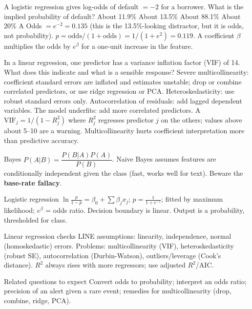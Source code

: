 {A logistic regression gives log-odds of default $=-2$ for a borrower. What is the implied probability of default?}
{About 11.9\%}
{About 13.5\%}
{About 88.1\%}
{About 20\%}
{A}
{Odds $=e^{-2}=0.135$ (this is the 13.5\%-looking distractor, but it is odds, not probability). $p=\text{odds}/(1+\text{odds})=1/(1+e^{2})=0.119$. A coefficient $\beta$ multiplies the odds by $e^{\beta}$ for a one-unit increase in the feature.}

{In a linear regression, one predictor has a variance inflation factor (VIF) of 14. What does this indicate and what is a sensible response?}
{Severe multicollinearity: coefficient standard errors are inflated and estimates unstable; drop or combine correlated predictors, or use ridge regression or PCA.}
{Heteroskedasticity: use robust standard errors only.}
{Autocorrelation of residuals: add lagged dependent variables.}
{The model underfits: add more correlated predictors.}
{A}
{$\text{VIF}_j=1/(1-R_j^2)$ where $R_j^2$ regresses predictor $j$ on the others; values above about 5--10 are a warning. Multicollinearity hurts coefficient interpretation more than predictive accuracy.}

{\begin{block}{Bayes}
		$P(A|B)=\dfrac{P(B|A)P(A)}{P(B)}$. Naive Bayes assumes features are conditionally independent given the class (fast, works well for text). Beware the \textbf{base-rate fallacy}.
	\end{block}
	\begin{block}{Logistic regression}
		$\ln\frac{p}{1-p}=\beta_0+\sum\beta_jx_j$; $p=\frac{1}{1+e^{-z}}$; fitted by maximum likelihood; $e^{\beta}$ = odds ratio. Decision boundary is linear. Output is a probability, thresholded for class.
\end{block}}
{\begin{block}{Linear regression checks}
		LINE assumptions: linearity, independence, normal (homoskedastic) errors. Problems: multicollinearity (VIF), heteroskedasticity (robust SE), autocorrelation (Durbin-Watson), outliers/leverage (Cook's distance). $R^2$ always rises with more regressors; use adjusted $R^2$/AIC.
	\end{block}
	\begin{alertblock}{Related questions to expect}
		Convert odds to probability; interpret an odds ratio; precision of an alert given a rare event; remedies for multicollinearity (drop, combine, ridge, PCA).
\end{alertblock}}
